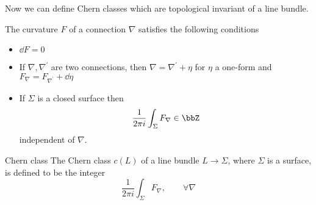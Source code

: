 Now we can define Chern classes which are topological invariant of a line bundle. 
\begin{proposition}
    The curvature $F$ of a connection $\nabla$ satisfies the following conditions 
    \begin{itemize}
        \item $\dd{F}=0$
        \item If $\nabla,\nabla^\prime$ are two connections, then $\nabla=\nabla^\prime +\eta$ for $\eta$ a one-form and $F_\nabla = F_{\nabla^\prime}+\dd{\eta}$
        \item If $\Sigma$ is a closed surface then 
        \begin{equation}
            \frac{1}{2\pi i} \int_\Sigma F_\nabla\in \bbZ
        \end{equation}
        independent of $\nabla$.
    \end{itemize}
\end{proposition}
\begin{defn}{Chern class}{}
    The Chern class $c(L)$ of a line bundle $L\rightarrow \Sigma$, where $\Sigma$ is a surface, is defined to be the integer 
    \begin{equation}
        \frac{1}{2\pi i}\int_\Sigma F_\nabla,\qquad \forall \nabla
    \end{equation}
\end{defn}

